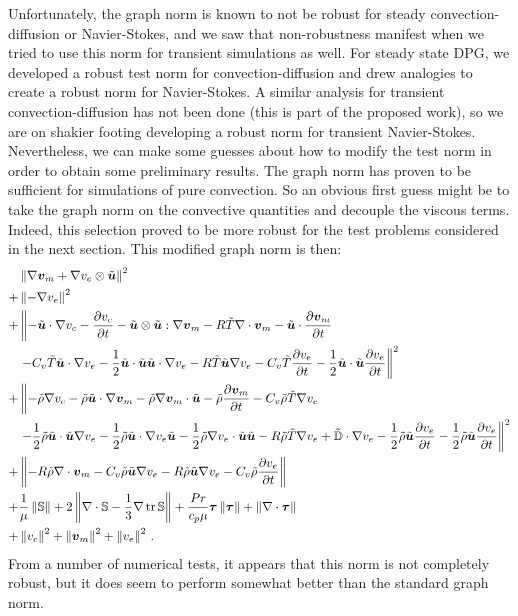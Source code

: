 \documentclass[Proposal.tex]{subfiles}
\begin{document}
Unfortunately, the graph norm is known to not be robust for steady convection-diffusion or Navier-Stokes,
and we saw that non-robustness manifest when we tried to use this norm for transient simulations as well.
For steady state DPG, we developed a robust test norm for convection-diffusion and drew analogies to create 
a robust norm for Navier-Stokes.
A similar analysis for transient convection-diffusion has not been done (this is part of the proposed work), 
so we are on shakier footing developing a robust norm for transient Navier-Stokes.
Nevertheless, we can make some guesses about how to modify the test norm in order to obtain some preliminary results.
The graph norm has proven to be sufficient for simulations of pure convection. 
So an obvious first guess might be to take the graph norm on the convective quantities and decouple the viscous terms.
Indeed, this selection proved to be more robust for the test problems considered in the next section.
This modified graph norm is then:
\begin{equation}
\begin{aligned}
&\left\| \nabla\boldsymbol v_m+\nabla v_e\otimes\tilde{\boldsymbol u} \right\|^2\\
+&\left\| -\nabla v_e \right\|^2\\
+&\left\|
-\tilde{\boldsymbol u}\cdot\nabla v_c-\frac{\partial v_c}{\partial t}-\tilde{\boldsymbol u}\otimes\tilde{\boldsymbol u}:\nabla\boldsymbol v_m
-R\tilde T\nabla\cdot\boldsymbol v_m-\tilde{\boldsymbol u}\cdot\frac{\partial\boldsymbol v_m}{\partial t}\right.\\
&\left.-C_v\tilde T\tilde{\boldsymbol u}\cdot\nabla v_e-\frac{1}{2}\tilde{\boldsymbol u}\cdot\tilde{\boldsymbol u}\tilde{\boldsymbol u}\cdot\nabla v_e
-R\tilde T\tilde{\boldsymbol u}\nabla v_e
-C_v\tilde T\frac{\partial v_e}{\partial t}-\frac{1}{2}\tilde{\boldsymbol u}\cdot\tilde{\boldsymbol u}\frac{\partial v_e}{\partial t}
\right\|^2\\
+&\left\|
-\tilde\rho\nabla v_c
-\tilde\rho\tilde{\boldsymbol u}\cdot\nabla\boldsymbol v_m-\tilde\rho\nabla\boldsymbol v_m\cdot\tilde{\boldsymbol u}
-\tilde\rho\frac{\partial\boldsymbol v_m}{\partial t}
-C_v\tilde\rho\tilde T\nabla v_e\right.\\
&\left.
-\frac{1}{2}\tilde\rho\tilde{\boldsymbol u}\cdot\tilde{\boldsymbol u}\nabla v_e
-\frac{1}{2}\tilde\rho\tilde{\boldsymbol u}\cdot\nabla v_e\tilde{\boldsymbol u}
-\frac{1}{2}\tilde\rho\nabla v_e\cdot\tilde{\boldsymbol u}\tilde{\boldsymbol u}
-R\tilde\rho\tilde T\nabla v_e
+\tilde{\mathbb{D}}\cdot\nabla v_e
-\frac{1}{2}\tilde\rho\tilde{\boldsymbol u}\frac{\partial v_e}{\partial t}
-\frac{1}{2}\tilde\rho\tilde{\boldsymbol u}\frac{\partial v_e}{\partial t}
\right\|^2\\
+&\left\|
-R\tilde\rho\nabla\cdot\boldsymbol v_m
-C_v\tilde\rho\tilde{\boldsymbol u}\nabla v_e
-R\tilde\rho\tilde{\boldsymbol u}\nabla v_e
-C_v\tilde\rho\frac{\partial v_e}{\partial t}
\right\|\\
+&\frac{1}{\mu}\left\| \mathbb{S} \right\|
+2\left\| \nabla\cdot\mathbb{S}-\frac{1}{3}\nabla\operatorname*{tr}{\mathbb{S}} \right\|
+\frac{Pr}{c_p\mu}\boldsymbol\tau\left\| \boldsymbol\tau \right\|
+\left\| \nabla\cdot\boldsymbol\tau \right\|\\
+&\left\| v_c \right\|^2
+\left\| \boldsymbol v_m \right\|^2
+\left\| v_e \right\|^2
\,.
\end{aligned}
\end{equation}
From a number of numerical tests, it appears that this norm is not completely robust, but it does seem to perform somewhat better
than the standard graph norm.
\end{document}
